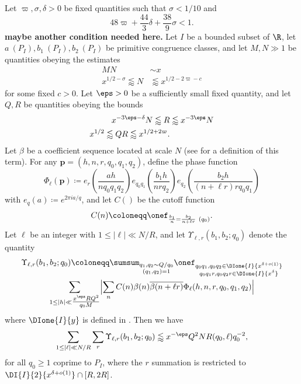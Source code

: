 \begin{theorem}\label{exp-sum}  Let $\varpi,\sigma,\delta > 0$ be fixed quantities such that $\sigma < 1/10$ and
\begin{equation}\label{vd}
 48 \varpi+ \frac{44}{3}\delta + \frac{38}{9} \sigma < 1.
\end{equation}
{\bf maybe another condition needed here.}
Let $I$ be a bounded subset of $\R$, let $a\ (P_I), b_1\ (P_I), b_2\ (P_I)$ be primitive congruence classes, and let $M,N \gg 1$ be quantities obeying the estimates
\begin{align}
MN &\sim x\label{mn-prod}\\
x^{1/2-\sigma} \lessapprox N &\lessapprox x^{1/2-2\varpi-c}\label{n-range}
\end{align}
for some fixed $c>0$.  Let $\eps>0$ be a sufficiently small fixed quantity, and let $Q, R$ be quantities obeying the bounds
\begin{align*}
x^{-3\eps-\delta} N \lessapprox R &\lessapprox x^{-3\eps} N \\
x^{1/2} \lessapprox QR \lessapprox x^{1/2+2\varpi}.
\end{align*}
Let $\beta$ be a coefficient sequence located at scale $N$ (see \cite[Definition 2.20]{polymath8a} for a definition of this term).  For any $\mathbf{p} = (h,n,r,q_0,q_1,q_2)$, define the phase function
$$ \Phi_\ell(\mathbf{p}) \coloneqq e_r( \frac{ah}{nq_0q_1q_2}) e_{q_0q_1}( \frac{b_1 h}{nrq_2} ) e_{q_2}( \frac{b_2 h}{(n+\ell r) r q_0 q_1} )$$
with $e_q(a) \coloneqq e^{2\pi i a/q}$, and let $C()$ be the cutoff function
$$ C(n) \coloneqq \onef_{\frac{b_1}{n} = \frac{b_2}{n+\ell r}\ (q_0)}.$$
Let $\ell$ be an integer with $1 \leq |\ell| \ll N/R$, and let $\Upsilon_{\ell,r}(b_1,b_2;q_0)$ denote the quantity
\begin{multline}\label{eq-upsilon}
  \Upsilon_{\ell,r}(b_1,b_2;q_0)\coloneqq \sumsum_{\substack{q_1,q_2\sim
      Q/q_0\\(q_1,q_2)=1}} \onef_{\substack{q_0q_1,q_0q_2
      \in\DIone{I}{x^{\delta+o(1)}} \\ q_0q_1 r,q_0q_2 r \in
      \DIone{I}{x^\delta} }}\\
  \sum_{1\leq |h|\ll \tfrac{x^{\eps}RQ^2}{q_0M}} \Bigl|\sum_{n} C(n)
  \beta(n)\overline{\beta(n+\ell r)}
  \Phi_{\ell}(h,n,r,q_0,q_1,q_2)\Bigr|
\end{multline}
where $\DIone{I}{y}$ is defined in \cite[Definition 2.14]{polymath8a}.  Then we have
$$ \sum_{1 \leq |\ell| \ll N/R} \sum_r \Upsilon_{\ell,r}(b_1,b_2;q_0) \lessapprox x^{-\eps} Q^2 N R (q_0,\ell) q_0^{-2},$$
for all $q_0 \geq 1$ coprime to $P_I$,
where the $r$ summation is restricted to $\DI{I}{2}{x^{\delta+o(1)}} \cap [R,2R]$.
\end{theorem}

